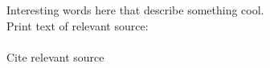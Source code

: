 \documentclass[../main]{subfiles}
\begin{document}
Interesting words here that describe something cool.\\
Print text of relevant source:\\
\\
Cite relevant source \cite{testcitation}


\end{document}
